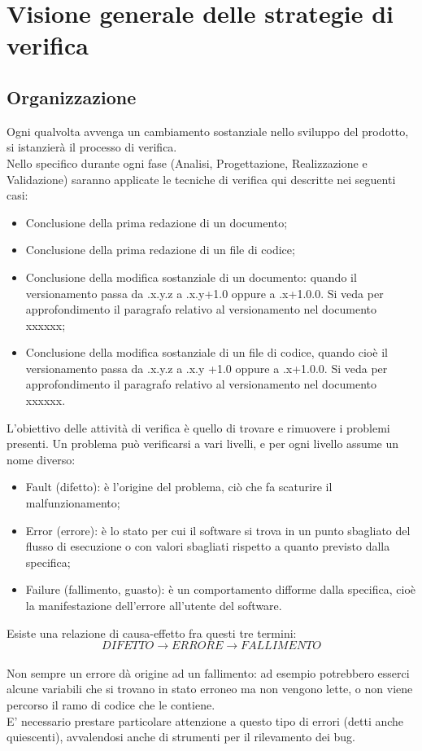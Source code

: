
\section{Visione generale delle strategie di verifica}

\subsection{Organizzazione}

Ogni qualvolta avvenga un cambiamento sostanziale nello sviluppo del prodotto, si istanzierà il processo di verifica. \\
Nello specifico durante ogni fase (Analisi, Progettazione, Realizzazione e Validazione) saranno applicate le tecniche di verifica qui descritte nei seguenti casi:
\begin{itemize}
	\item Conclusione della prima redazione di un documento;
	\item Conclusione della prima redazione di un file di codice;
	\item Conclusione della modifica sostanziale di un documento: quando il versionamento passa da .x.y.z a .x.y+1.0 oppure a .x+1.0.0. Si veda per approfondimento il paragrafo relativo al versionamento nel documento xxxxxx;
	\item Conclusione della modifica sostanziale di un file di codice, quando cioè il versionamento passa da .x.y.z a .x.y +1.0 oppure a .x+1.0.0. Si veda per approfondimento il paragrafo relativo al versionamento nel documento xxxxxx.
\end{itemize}
L'obiettivo delle attività di verifica è quello di trovare e rimuovere i problemi presenti. Un problema può verificarsi a vari livelli, e per ogni livello assume un nome diverso:
\begin{itemize}
	\item Fault (difetto): è l'origine del problema, ciò che fa scaturire il malfunzionamento;
	\item Error (errore): è lo stato per cui il software si trova in un punto sbagliato del flusso di esecuzione o con valori sbagliati rispetto a quanto previsto dalla specifica;
	\item Failure (fallimento, guasto): è un comportamento difforme dalla specifica, cioè la manifestazione dell'errore all'utente del software.
\end{itemize}
Esiste una relazione di causa-effetto fra questi tre termini:\\
\[DIFETTO\longrightarrow ERRORE\longrightarrow FALLIMENTO\]\\
Non sempre un errore dà origine ad un fallimento: ad esempio potrebbero esserci alcune variabili che si trovano in stato erroneo ma non vengono lette, o non viene percorso il ramo di codice che le contiene.\\
E' necessario prestare particolare attenzione a questo tipo di errori (detti anche quiescenti), avvalendosi anche di strumenti per il rilevamento dei bug.


